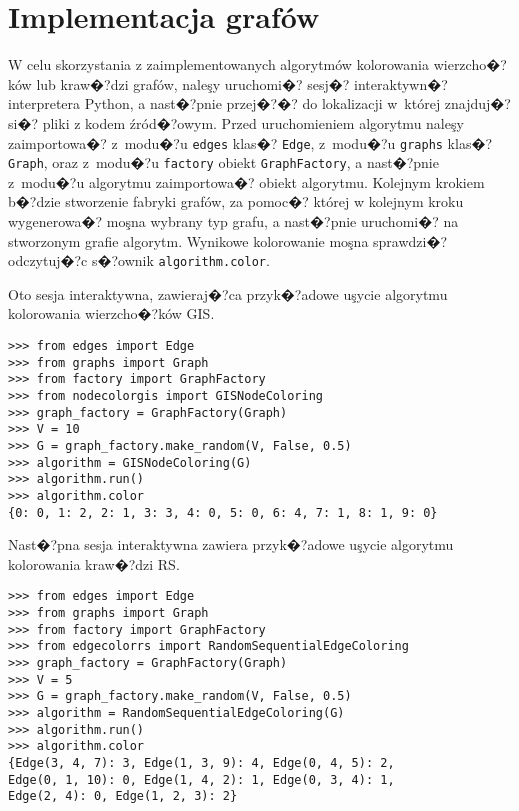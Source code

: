 \documentclass[12pt,a4paper]{mwrep}
\begin{document}

\chapter{Implementacja grafów}
\label{ch:implementacja_grafow}

W celu skorzystania z zaimplementowanych algorytmów kolorowania wierzcho�?ków 
lub kraw�?dzi grafów, naleşy uruchomi�? sesj�? interaktywn�? interpretera Python,
a nast�?pnie przej�?�? do lokalizacji
w~której znajduj�? si�? pliki z kodem źród�?owym. 
Przed uruchomieniem algorytmu naleşy zaimportowa�? 
z~modu�?u \lstinline|edges| klas�? \lstinline|Edge|, 
z~modu�?u \lstinline|graphs| klas�? \lstinline|Graph|,
oraz z~modu�?u \lstinline|factory| obiekt \lstinline|GraphFactory|, 
a nast�?pnie z~modu�?u algorytmu zaimportowa�? obiekt algorytmu.
Kolejnym krokiem b�?dzie stworzenie fabryki grafów, za pomoc�? której 
w kolejnym kroku wygenerowa�? moşna wybrany typ grafu, a nast�?pnie 
uruchomi�? na stworzonym grafie algorytm. 
Wynikowe kolorowanie moşna sprawdzi�? odczytuj�?c s�?ownik 
\lstinline|algorithm.color|.

Oto sesja interaktywna, zawieraj�?ca przyk�?adowe uşycie 
algorytmu kolorowania wierzcho�?ków GIS.

\begin{lstlisting}[caption={Korzystanie z kolorowania wierzcho�?ków GIS.},
label={lst:korzystanie_z_GIS}]
>>> from edges import Edge
>>> from graphs import Graph
>>> from factory import GraphFactory
>>> from nodecolorgis import GISNodeColoring
>>> graph_factory = GraphFactory(Graph)
>>> V = 10
>>> G = graph_factory.make_random(V, False, 0.5)
>>> algorithm = GISNodeColoring(G)
>>> algorithm.run()
>>> algorithm.color
{0: 0, 1: 2, 2: 1, 3: 3, 4: 0, 5: 0, 6: 4, 7: 1, 8: 1, 9: 0}
\end{lstlisting}

Nast�?pna sesja interaktywna zawiera przyk�?adowe uşycie 
algorytmu kolorowania kraw�?dzi RS.

\begin{lstlisting}[caption={Korzystanie z kolorowania kraw�?dzi RS.},
label={lst:korzystanie_z_RS}]
>>> from edges import Edge
>>> from graphs import Graph
>>> from factory import GraphFactory
>>> from edgecolorrs import RandomSequentialEdgeColoring
>>> graph_factory = GraphFactory(Graph)
>>> V = 5
>>> G = graph_factory.make_random(V, False, 0.5)
>>> algorithm = RandomSequentialEdgeColoring(G)
>>> algorithm.run()
>>> algorithm.color
{Edge(3, 4, 7): 3, Edge(1, 3, 9): 4, Edge(0, 4, 5): 2, 
Edge(0, 1, 10): 0, Edge(1, 4, 2): 1, Edge(0, 3, 4): 1, 
Edge(2, 4): 0, Edge(1, 2, 3): 2}
\end{lstlisting}
\end{document}
